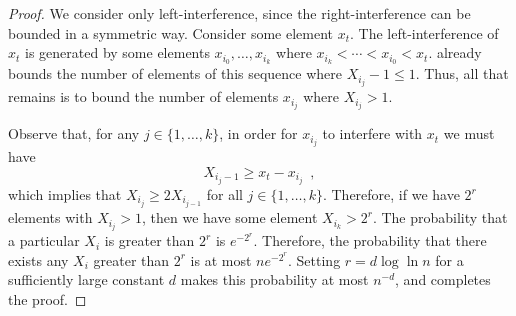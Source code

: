 \documentclass{patmorin}
\begin{document}
\begin{proof}
We consider only left-interference, since the right-interference
can be bounded in a symmetric way.  Consider some element $x_t$.  The
left-interference of $x_t$ is generated by some elements
$x_{i_0},\ldots,x_{i_k}$ where $x_{i_k}<\cdots<
x_{i_0}<x_t$.   already bounds the number of elements of this
sequence where $X_{i_j}-1 \le 1$.  Thus, all that remains is to bound
the number of elements $x_{i_j}$ where $X_{i_j} > 1$.

Observe that, for any $j\in\{1,\ldots,k\}$, in order for $x_{i_j}$
to interfere with $x_t$ we must have
\[
   X_{i_j-1} \ge x_t - x_{i_j} 
\enspace ,
\]
which implies that $X_{i_j} \ge 2 X_{i_{j-1}}$ for all
$j\in\{1,\ldots,k\}$.  Therefore, if we have $2^r$ elements with
$X_{i_j}>1$, then we have some element $X_{i_k} > 2^r$.  The probability
that a particular $X_i$ is greater than $2^r$ is $e^{-2^r}$. Therefore,
the probability that there exists any $X_i$ greater than $2^r$ is at most
$ne^{-2^r}$.  Setting $r=d\log\ln n$ for a sufficiently large constant
$d$ makes this probability at most $n^{-d}$, and completes the proof.
\end{proof}
\end{document}

